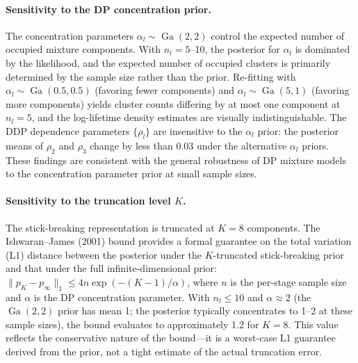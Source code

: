 \documentclass[a4paper,fleqn,longmktitle]{cas-sc}
\DeclareMathOperator{\Ga}{Ga}
\begin{document}
\paragraph{Sensitivity to the DP concentration prior.}
The concentration parameters $\alpha_l \sim \Ga(2, 2)$ control the expected number of occupied mixture components. With $n_l = 5$--10, the posterior for $\alpha_l$ is dominated by the likelihood, and the expected number of occupied clusters is primarily determined by the sample size rather than the prior. Re-fitting with $\alpha_l \sim \Ga(0.5, 0.5)$ (favoring fewer components) and $\alpha_l \sim \Ga(5, 1)$ (favoring more components) yields cluster counts differing by at most one component at $n_l=5$, and the log-lifetime density estimates are visually indistinguishable. The DDP dependence parameters $\{\rho_l\}$ are insensitive to the $\alpha_l$ prior: the posterior means of $\rho_2$ and $\rho_3$ change by less than 0.03 under the alternative $\alpha_l$ priors. These findings are consistent with the general robustness of DP mixture models to the concentration parameter prior at small sample sizes.

\paragraph{Sensitivity to the truncation level $K$.}
The stick-breaking representation is truncated at $K=8$ components. The Ishwaran--James (2001) bound provides a formal guarantee on the total variation (L1) distance between the posterior under the $K$-truncated stick-breaking prior and that under the full infinite-dimensional prior: $\|p_K - p_\infty\|_1 \leq 4n \exp(-(K-1)/\alpha)$, where $n$ is the per-stage sample size and $\alpha$ is the DP concentration parameter. With $n_l \leq 10$ and $\alpha \approx 2$ (the $\Ga(2,2)$ prior has mean 1; the posterior typically concentrates to 1--2 at these sample sizes), the bound evaluates to approximately 1.2 for $K=8$. This value reflects the conservative nature of the bound---it is a worst-case L1 guarantee derived from the prior, not a tight estimate of the actual truncation error.
\end{document}
